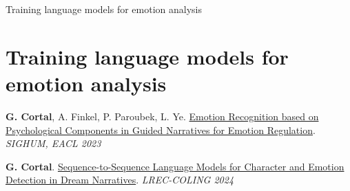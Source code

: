 \documentclass[10pt]{beamer}
\begin{document}
\begin{frame}{}
\Large
\begin{center}
    Training language models for emotion analysis
    \section{Training language models for emotion analysis}
\end{center}

\vspace{1.5cm}

\footnotesize




\textbf{G. Cortal}, A. Finkel, P. Paroubek, L. Ye. \href{https://aclanthology.org/2023.latechclfl-1.8/}{Emotion Recognition based on Psychological Components in Guided Narratives for Emotion Regulation}. \textit{SIGHUM, EACL 2023}

\vspace{0.5cm}

\textbf{G. Cortal}. \href{https://aclanthology.org/2024.lrec-main.1282/}{Sequence-to-Sequence Language Models for Character and Emotion Detection in Dream Narratives}. \textit{LREC-COLING 2024}

\end{frame}
\end{document}
